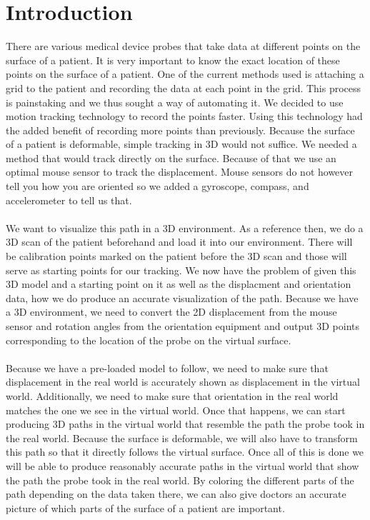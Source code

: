 \section{Introduction}

There are various medical device probes that take data at different points on the surface of a patient. It is very important to know the exact location of these points on the surface of a patient. One of the current methods used is attaching a grid to the patient and recording the data at each point in the grid. This process is painstaking and we thus sought a way of automating it. We decided to use motion tracking technology to record the points faster. Using this technology had the added benefit of recording more points than previously. Because the surface of a patient is deformable, simple tracking in 3D would not suffice. We needed a method that would track directly on the surface. Because of that we use an optimal mouse sensor to track the displacement. Mouse sensors do not however tell you how you are oriented so we added a gyroscope, compass, and accelerometer to tell us that. \\
\\
We want to visualize this path in a 3D environment. As a reference then, we do a 3D scan of the patient beforehand and load it into our environment. There will be calibration points marked on the patient before the 3D scan and those will serve as starting points for our tracking. We now have the problem of given this 3D model and a starting point on it as well as the displacment and orientation data, how we do produce an accurate visualization of the path. Because we have a 3D environment, we need to convert the 2D displacement from the mouse sensor and rotation angles from the orientation equipment and output 3D points corresponding to the location of the probe on the virtual surface. \\
\\
Because we have a pre-loaded model to follow, we need to make sure that displacement in the real world is accurately shown as displacement in the virtual world. Additionally, we need to make sure that orientation in the real world matches the one we see in the virtual world. Once that happens, we can start producing 3D paths in the virtual world that resemble the path the probe took in the real world. Because the surface is deformable, we will also have to transform this path so that it directly follows the virtual surface. Once all of this is done we will be able to produce reasonably accurate paths in the virtual world that show the path the probe took in the real world. By coloring the different parts of the path depending on the data taken there, we can also give doctors an accurate picture of which parts of the surface of a patient are important.